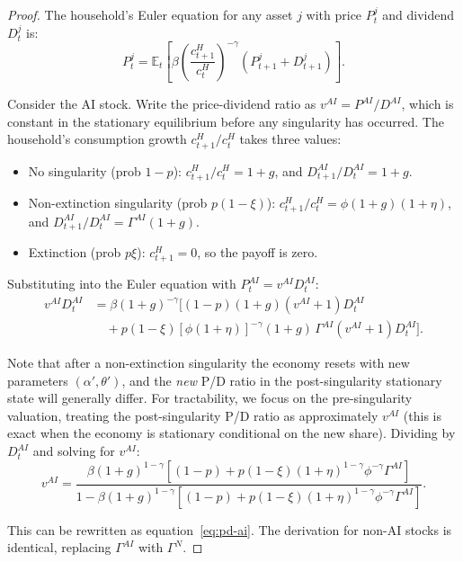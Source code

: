 \documentclass[12pt]{article}
\begin{document}
\begin{proof}
The household's Euler equation for any asset $j$ with price $P_t^j$ and dividend $D_t^j$ is:
%
\begin{equation}
P_t^j = \mathbb{E}_t \left[ \beta \left( \frac{c_{t+1}^H}{c_t^H} \right)^{-\gamma} (P_{t+1}^j + D_{t+1}^j) \right]. \label{eq:euler}
\end{equation}

Consider the AI stock. Write the price-dividend ratio as $v^{AI} = P^{AI}/D^{AI}$, which is constant in the stationary equilibrium before any singularity has occurred. The household's consumption growth $c_{t+1}^H / c_t^H$ takes three values:
%
\begin{itemize}
\item No singularity (prob $1-p$): $c_{t+1}^H / c_t^H = 1+g$, and $D_{t+1}^{AI}/D_t^{AI} = 1+g$.
\item Non-extinction singularity (prob $p(1-\xi)$): $c_{t+1}^H / c_t^H = \phi(1+g)(1+\eta)$, and $D_{t+1}^{AI}/D_t^{AI} = \Gamma^{AI} (1+g)$.
\item Extinction (prob $p\xi$): $c_{t+1}^H = 0$, so the payoff is zero.
\end{itemize}

Substituting into the Euler equation with $P_t^{AI} = v^{AI} D_t^{AI}$:
\begin{align}
v^{AI} D_t^{AI} &= \beta(1+g)^{-\gamma} \Big[ (1-p)(1+g)(v^{AI}+1) D_t^{AI} \nonumber \\
&\quad + p(1-\xi) [\phi(1+\eta)]^{-\gamma} (1+g) \, \Gamma^{AI} (v^{AI}+1) D_t^{AI} \Big]. \label{eq:euler-expand}
\end{align}

Note that after a non-extinction singularity the economy resets with new parameters $(\alpha', \theta')$, and the \emph{new} P/D ratio in the post-singularity stationary state will generally differ. For tractability, we focus on the pre-singularity valuation, treating the post-singularity P/D ratio as approximately $v^{AI}$ (this is exact when the economy is stationary conditional on the new share). Dividing by $D_t^{AI}$ and solving for $v^{AI}$:
%
\begin{equation}
v^{AI} = \frac{\beta(1+g)^{1-\gamma}\left[(1-p) + p(1-\xi)(1+\eta)^{1-\gamma}\phi^{-\gamma} \Gamma^{AI}\right]}{1 - \beta(1+g)^{1-\gamma}\left[(1-p) + p(1-\xi)(1+\eta)^{1-\gamma}\phi^{-\gamma} \Gamma^{AI}\right]}. \label{eq:pd-ai-solve}
\end{equation}

This can be rewritten as equation~\eqref{eq:pd-ai}. The derivation for non-AI stocks is identical, replacing $\Gamma^{AI}$ with $\Gamma^{N}$.
\end{proof}
\end{document}
